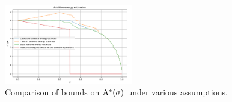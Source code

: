 \begin{figure}
    \centering
    \includegraphics[width=0.5\textwidth]{chapter/zero_density_energy_estimate.png}
    \caption{Comparison of bounds on $\mathrm{A}^*(\sigma)$ under various assumptions.}
    \label{fig:zero_density_energy_estimate}
\end{figure}


